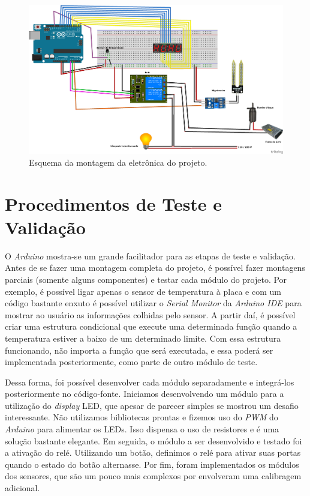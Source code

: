 \documentclass[a4paper,12pt]{article}
\begin{document}
		\begin{figure}[!ht]
		  \centering
		    \includegraphics[width=1.15\textwidth]{EsquemaEletronica.png}
		    \caption{Esquema da montagem da eletrônica do projeto.}
		\end{figure}





\section{Procedimentos de Teste e Validação}

    O \textit{Arduino} mostra-se um grande facilitador para as etapas de teste e validação. Antes de se fazer uma montagem completa do projeto, é possível fazer montagens parciais (somente alguns componentes) e testar cada módulo do projeto. Por exemplo, é possível ligar apenas o sensor de temperatura à placa e com um código bastante enxuto é possível utilizar o \textit{Serial Monitor} da \textit{Arduino IDE} para mostrar ao usuário as informações colhidas pelo sensor. A partir daí, é possível criar uma estrutura condicional que execute uma determinada função quando a temperatura estiver a baixo de um determinado limite. Com essa estrutura funcionando, não importa a função que será executada, e essa poderá ser implementada posteriormente, como parte de outro módulo de teste.

    Dessa forma, foi possível desenvolver cada módulo separadamente e integrá-los posteriormente no código-fonte. Iniciamos desenvolvendo um módulo para a utilização do \textit{display} LED, que apesar de parecer simples se mostrou um desafio interessante. Não utilizamos bibliotecas prontas e fizemos uso do \textit{PWM} do \textit{Arduino} para alimentar os LEDs. Isso dispensa o uso de resistores e é uma solução bastante elegante. Em seguida, o módulo a ser desenvolvido e testado foi a ativação do relé. Utilizando um botão, definimos o relé para ativar suas portas quando o estado do botão alternasse. Por fim, foram implementados os módulos dos sensores, que são um pouco mais complexos por envolveram uma calibragem adicional.
\end{document}
